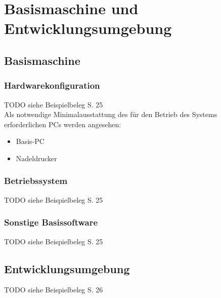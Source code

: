 \chapter{Basismaschine und Entwicklungsumgebung}
\section{Basismaschine}
\subsection{Hardwarekonfiguration}
TODO siehe Beispielbeleg S. 25\\
Als notwendige Minimalausstattung des für den Betrieb des Systems erforderlichen PCs werden angesehen:
\begin{itemize}
 \item Basis-PC
 \item Nadeldrucker
\end{itemize}


\subsection{Betriebssystem}
TODO siehe Beispielbeleg S. 25


\subsection{Sonstige Basissoftware}
TODO siehe Beispielbeleg S. 25


\section{Entwicklungsumgebung}
TODO siehe Beispielbeleg S. 26